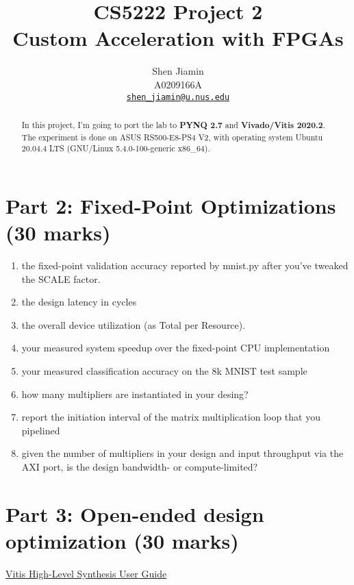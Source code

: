 \documentclass{article}
\begin{document}
\title{\bfseries
  CS5222 Project 2 \\
  Custom Acceleration with FPGAs\\
}

\author{
  Shen Jiamin \\
  A0209166A \\
  \href{mailto:shen_jiamin@u.nus.edu}{\nolinkurl{shen_jiamin@u.nus.edu}}
}

\maketitle

\begin{abstract}
  In this project, I'm going to port the lab to \textbf{PYNQ 2.7} and \textbf{Vivado/Vitis 2020.2}.
  The experiment is done on ASUS RS500-E8-PS4 V2, with operating system
  Ubuntu 20.04.4 LTS (GNU/Linux 5.4.0-100-generic x86\_64).
\end{abstract}




\section{Part 2: Fixed-Point Optimizations (30 marks)}

\begin{enumerate}
  \item the fixed-point validation accuracy reported by mnist.py after you've tweaked the SCALE factor.
  \item the design latency in cycles
  \item the overall device utilization (as Total per Resource).
  \item your measured system speedup over the fixed-point CPU implementation
  \item your measured classification accuracy on the 8k MNIST test sample
  \item how many multipliers are instantiated in your desing?
  \item report the initiation interval of the matrix multiplication loop that you pipelined
  \item given the number of multipliers in your design and input throughput via the AXI port, is the design bandwidth- or compute-limited?
\end{enumerate}

\section{Part 3: Open-ended design optimization (30 marks)}

\href{https://www.xilinx.com/support/documentation/sw_manuals/xilinx2020_2/ug1399-vitis-hls.pdf}{Vitis High-Level Synthesis User Guide}


% 
% 

\clearpage
\appendix
\end{document}
